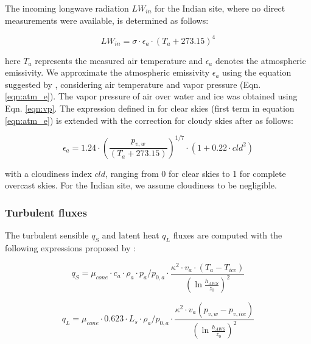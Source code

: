 The incoming longwave radiation $LW_{in}$ for the Indian site, where no direct measurements were available, is
determined as follows:

\begin{equation}
	LW_{in}=\sigma \cdot \epsilon_a \cdot {(T_a+ 273.15)}^4
	\label{eqn:LWin}
\end{equation}

here $T_a$ represents the measured air temperature and $\epsilon_a$ denotes the atmospheric emissivity. We
approximate the atmospheric emissivity $\epsilon_a$ using the equation suggested by \cite{brutsaertEvaporationAtmosphereTheory1982},
considering air temperature and vapor pressure (Eqn.  \ref{eqn:atm_e}). The vapor pressure of air over water and
ice was obtained using Eqn. \ref{eqn:vp}.  The expression defined in \cite{brutsaertDerivableFormulaLongwave1975} for clear skies
(first term in equation \ref{eqn:atm_e}) is extended with the correction for cloudy skies after
\cite{brutsaertEvaporationAtmosphereTheory1982} as follows:

\begin{equation}
	\epsilon_a=1.24 \cdot (\frac{p_{v,w}}{(T_a+273.15)})^{1/7}\cdot(1+0.22\cdot{cld}^2) \label{eqn:atm_e}
\end{equation}

with a cloudiness index $cld$, ranging from 0 for clear skies to 1 for complete overcast skies. For the Indian
site, we assume cloudiness to be negligible.

\subsubsection{Turbulent fluxes} \label{sec:Qs}

The turbulent sensible $q_{S}$ and latent heat $q_{L}$ fluxes are computed with the following expressions
proposed by \cite{garrattAtmosphericBoundaryLayer1992}:

\begin{equation}
	q_{S}=\mu_{cone}\cdot c_{a} \cdot \rho_{a} \cdot p_{a}/p_{0,a} \cdot \frac{\kappa^2 \cdot v_a \cdot
		(T_a-T_{ice})}{{(\ln{\frac{h_{AWS}}{z_{0}}})}^2}
	\label{eqn:qs}
\end{equation}

\begin{equation}
	q_{L}=\mu_{cone}\cdot 0.623 \cdot L_s \cdot \rho_{a}/p_{0,a} \cdot \frac{\kappa^2 \cdot
	v_a(p_{v,w}-p_{v,ice})}{{(\ln{\frac{h_{AWS}}{z_{0}}})}^2}
\end{equation}

